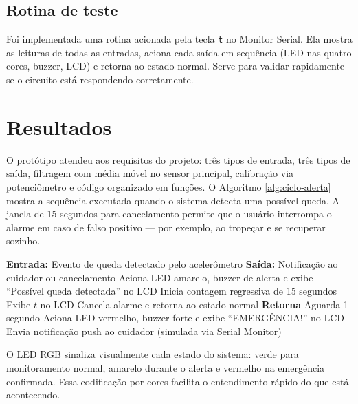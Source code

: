 \subsection{\esp Rotina de teste}

Foi implementada uma rotina acionada pela tecla \verb|t| no Monitor Serial. Ela mostra as leituras de todas as entradas, aciona cada saída em sequência (LED nas quatro cores, buzzer, LCD) e retorna ao estado normal. Serve para validar rapidamente se o circuito está respondendo corretamente.

\section{\esp Resultados}

O protótipo atendeu aos requisitos do projeto: três tipos de entrada, três tipos de saída, filtragem com média móvel no sensor principal, calibração via potenciômetro e código organizado em funções. O Algoritmo \ref{alg:ciclo-alerta} mostra a sequência executada quando o sistema detecta uma possível queda. A janela de 15 segundos para cancelamento permite que o usuário interrompa o alarme em caso de falso positivo --- por exemplo, ao tropeçar e se recuperar sozinho.

\begin{center}
\begin{minipage}[ht]{13cm}
\begin{algorithm}[H]
  \footnotesize
  \caption{Ciclo de Alerta e Emergência}
  \label{alg:ciclo-alerta}
  \begin{algorithmic}[1]
    \STATE \textbf{Entrada:} Evento de queda detectado pelo acelerômetro
    \STATE \textbf{Saída:} Notificação ao cuidador ou cancelamento
    \STATE Aciona LED amarelo, buzzer de alerta e exibe ``Possível queda detectada'' no LCD
    \STATE Inicia contagem regressiva de 15 segundos
        \STATE Exibe $t$ no LCD
            \STATE Cancela alarme e retorna ao estado normal
            \STATE \textbf{Retorna}
        \ENDIF
        \STATE Aguarda 1 segundo
    \ENDFOR
    \STATE Aciona LED vermelho, buzzer forte e exibe ``EMERGÊNCIA!'' no LCD
    \STATE Envia notificação push ao cuidador (simulada via Serial Monitor)
  \end{algorithmic}
\end{algorithm}
\end{minipage}
\end{center}

O LED RGB sinaliza visualmente cada estado do sistema: verde para monitoramento normal, amarelo durante o alerta e vermelho na emergência confirmada. Essa codificação por cores facilita o entendimento rápido do que está acontecendo.

